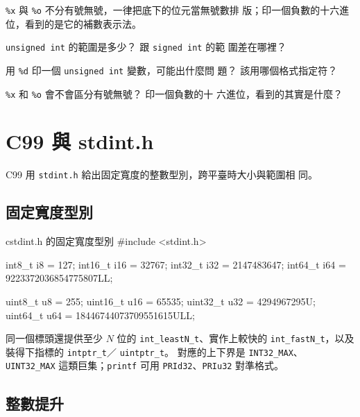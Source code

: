 \texttt{\%x} 與 \texttt{\%o} 不分有號無號，一律把底下的位元當無號數排
版；印一個負數的十六進位，看到的是它的補數表示法。


\begin{drills}[label=drills:decl-signed-unsigned]
\item \texttt{unsigned int} 的範圍是多少？ 跟 \texttt{signed int} 的範
圍差在哪裡？
\item 用 \texttt{\%d} 印一個 \texttt{unsigned int} 變數，可能出什麼問
題？ 該用哪個格式指定符？
\item \texttt{\%x} 和 \texttt{\%o} 會不會區分有號無號？ 印一個負數的十
六進位，看到的其實是什麼？
\end{drills}

\section{C99 與 stdint.h}
\label{sec:decl-stdint}

C99 用 \texttt{stdint.h} 給出固定寬度的整數型別，跨平臺時大小與範圍相
同。

\subsection{固定寬度型別}

\begin{code}{c}{stdint.h 的固定寬度型別}
#include <stdint.h>

int8_t i8 = 127;
int16_t i16 = 32767;
int32_t i32 = 2147483647;
int64_t i64 = 9223372036854775807LL;

uint8_t u8 = 255;
uint16_t u16 = 65535;
uint32_t u32 = 4294967295U;
uint64_t u64 = 18446744073709551615ULL;
\end{code}

同一個標頭還提供至少 $N$ 位的 \texttt{int\_leastN\_t}、實作上較快的
\texttt{int\_fastN\_t}，以及裝得下指標的 \texttt{intptr\_t}／
\texttt{uintptr\_t}。 對應的上下界是 \texttt{INT32\_MAX}、
\texttt{UINT32\_MAX} 這類巨集；\texttt{printf} 可用
\texttt{PRId32}、\texttt{PRIu32} 對準格式。

\subsection{整數提升}

